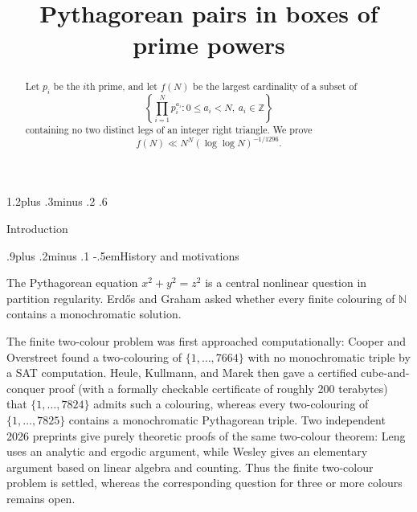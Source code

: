 \documentclass[twoside]{aomart}
\title[Pythagorean pairs in boxes of prime powers]{Pythagorean pairs in boxes of prime powers}
\date{}
\makeatletter
\theoremstyle{paperplain}
\theoremstyle{paperdefinition}
\renewcommand\section{\@startsection{section}{1}{\z@}
  {1.2\baselineskip plus .3\baselineskip minus .2\baselineskip}
  {.6\baselineskip}{\normalfont\large\bfseries\raggedright}}
\renewcommand\subsection{\@startsection{subsection}{2}{\z@}
  {.9\baselineskip plus .2\baselineskip minus .1\baselineskip}
  {-.5em}{\normalfont\bfseries}}
\newcommand{\Z}{\mathbb Z}
\newcommand{\N}{\mathbb N}
\numberwithin{equation}{section}
\makeatother
\begin{document}
\begin{abstract}
Let $p_i$ be the $i$th prime, and let $f(N)$ be the largest cardinality
of a subset of \[
\left\{\prod_{i=1}^N p_i^{a_i}:0\le a_i<N,\ a_i\in\Z\right\}
\]
containing no two distinct legs of an integer right triangle.
We prove
\[
 f(N)
 \ll N^N (\log\log N)^{-1/1296}.
\]
\end{abstract}
\maketitle
\begingroup
\color{ContentsBlue}
\hypersetup{linkcolor=ContentsBlue}
\tableofcontents
\par\removelastskip
\endgroup
\section{Introduction}
\label{sec:introduction}

\subsection{History and motivations}

The Pythagorean equation $x^2+y^2=z^2$ is a central nonlinear question
in partition regularity.  Erd\H{o}s and
Graham \cite[Section~3, Problem~6]{GrahamFavorite} asked whether every
finite colouring of $\N$ contains a monochromatic solution.  

The finite two-colour
problem was first approached computationally: Cooper and Overstreet
\cite{CooperOverstreet} found a two-colouring of
$\{1,\ldots,7664\}$ with no monochromatic triple by a SAT computation.
Heule, Kullmann, and Marek \cite[Theorem~1]{HeuleKullmannMarek} then gave
a certified cube-and-conquer proof (with a formally checkable certificate
of roughly 200 terabytes) that $\{1,\ldots,7824\}$ admits such a colouring,
whereas every two-colouring of $\{1,\ldots,7825\}$ contains a
monochromatic Pythagorean triple.  Two independent 2026 preprints give
purely theoretic proofs of the same two-colour theorem: Leng \cite{Leng2026} uses an
analytic and ergodic argument, while Wesley \cite{Wesley2026} gives an
elementary argument based on linear algebra and counting.  Thus the
finite two-colour problem is settled, whereas the corresponding question
for three or more colours remains open.
\end{document}
